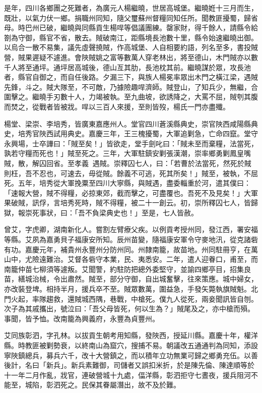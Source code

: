 \begin{pinyinscope}
是年，四川各鄉團之死難者，為廣元人楊繼曉，世居高城堡。繼曉姙十三月而生，既壯，以氣力伏一鄉。捐職州同知，隨父璽蘇州督糧同知任所。聞教匪擾蜀，歸省母。時巴州已破，繼曉與同縣貢生楊哻等倡議團練。罄家財，得千餘人，請縣令給劄為守御，縣官不省，散去。賊破南江，距縣境長池數十里，縣令始速繼曉出御。以烏合一散不易集，議先虛聲撓賊，作高城堡、人自相要約語，列名至多，書投賊營，賊果遲疑不遽進。會陜賊姚之富等數萬人穿老林出，將至德山，木門賊亦以數千人將至通坪。通坪居高城後，德山亙其肋，長池枕其前。繼曉謀於眾，攻長池者，縣官自御之，而自任後路。夕漏三下，與族人楊冕率眾出木門之橫江梁，遇賊先鋒，斗之。賊大隊至，不可敵，乃據險趣哻濟師。賊登山，了知兵少，無繼，合圍擊之。繼曉手刃數十人，力竭被執。至九曲坡，欲誘降之，大罵不屈，賊刳其腹而焚之，從戰者皆被戕。哻以三百人來援，至則皆歿，楊氏一門亦盡殲。

楊堂、梁崇、李培秀，皆廣東嘉應州人。堂官四川蒼溪縣典史，崇官陜西咸陽縣典史，培秀官陜西試用典史。嘉慶三年，王三槐擾蜀，大軍追剿急，亡命四竄。堂守永興場，士卒譁曰：「賊至矣！」皆欲走，堂手劍叱曰：「賊未至而棄糧，法當死，孰若守糧而死也！」賊至死之。三年，大軍駐鎮安剿張漢潮，崇率鄉勇剿鳳皇嘴賊，散，解囚回省。至孝義，遇賊。崇釋囚七人，曰：「若曹於法當死，然死於賊則枉，吾不忍也，可速去，毋從賊。餘義不可逃，死其所矣！」賊至，被執，不屈死。五年，培秀從大軍挽粟至四川大寧縣，與賊遇，盡委輜重於河，遣其僕曰：「速報大營，賊不得糧，必掠東郊，截而擊之，可盡覆也。吾死不及見矣！」大軍果破賊，訊俘，言培秀死時，賊不得糧，被二十一創云。初，崇所釋囚七人，皆歸獄，報崇死事狀，曰：「吾不負梁典史也！」至是，七人皆赦。

曾艾，字虎卿，湖南新化人。嘗割左臂療父疾。以例貢考授州同，發江西，署安福等縣。艾夙為嘉勇貝子福康安所知。辰州苗變，隨福康安軍令守麥地汛，從克諸砦有功。嘉慶元年，補貴州永豐州分防州同。州隸南籠，故苗地。州同駐冊亨，在萬山中，尤險遠難治。艾督各砦守本業，民、夷悉安。二年，遣人迎眷口，甫至，而南籠仲苗七柳須等遽叛。艾聞警，約駐防把總外委堅守，並諭四鄉亭目，招集良苗，繕城治械，令出肅然。賊至，部分守御，自出城奮擊，往來策應。城中婦女，亦改裝登埤。相持半月，援兵卒不至。賊眾數萬，圍益急，手發矢斃執旗賊魁。北門火起，率隊趨救，還賊城西隅，巷戰，中槍死。僕九人從死，兩妾聞訊皆自刎。次子為其戚攜出，號泣曰：「吾父母皆死，何以生為？」賊尾及之，亦中槍而殞。事聞，皆予恤。改南籠為興義府，永豐為貞豐州。

艾同族彰泗，字孔林。以拔貢生朝考用知縣，發陜西，授延川縣。嘉慶十年，權洋縣。時教匪被剿勢衰，以終南山為窟穴，搜捕不易。朝議改五通通判為同知，添設寧陜鎮總兵，募兵六千，改十大營鎮之，而以積年立功無業可歸之鄉勇充伍。以善後計，名曰「新兵」。新兵素難御，司儲者又誤扣米折，於是陳先倫、陳達順等於十一年二月作亂，戕官，連破營城十九處，偪洋縣，彰泗拒守七晝夜，援兵阻河不能至，城陷，彰泗死之。民保其眷屬潛出，故不及於難。


\end{pinyinscope}
